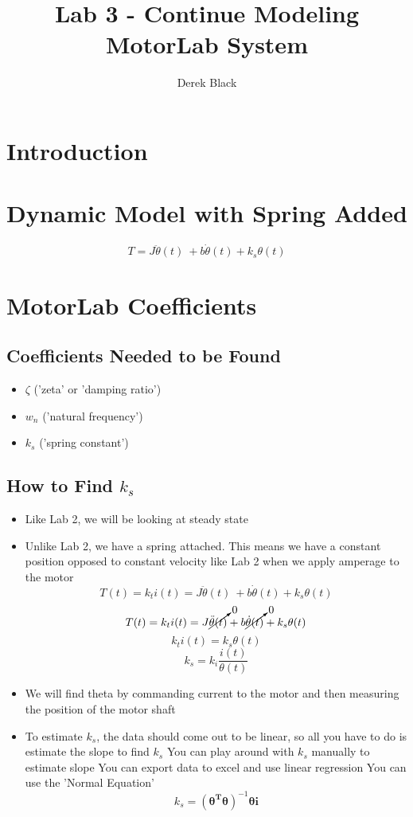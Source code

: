 \documentclass[11pt, oneside]{article}   	%
\title{\vspace{-3.0cm}Lab 3 - Continue Modeling MotorLab System}
\author{Derek Black}
\date{\vspace{-5ex}}
\newcommand{\matrva}[1]{\bm{#1}}
\begin{document}
\maketitle

\section{Introduction}

\section{Dynamic Model with Spring Added}

\[T = J \ddot \theta(t) \ + b \dot \theta(t) + k_s \theta(t) \]

\section{MotorLab Coefficients}
\subsection{Coefficients Needed to be Found}
\begin{itemize}
\item \(\zeta\)    ('zeta' or 'damping ratio')
\item \(w_n\)     ('natural frequency')
\item \(k_s\)      ('spring constant')
\end{itemize}

\subsection{How to Find \(k_s\)}
\begin{itemize}
\item Like Lab 2, we will be looking at steady state
\item Unlike Lab 2, we have a spring attached. This means we have a constant position opposed to constant velocity like Lab 2 when we apply amperage to the motor
\[T(t) = k_t i(t) =  J \ddot \theta(t) \ + b \dot \theta(t) + k_s \theta(t) \]
\[T(t) = k_t i(t) =  J \cancelto{0}{\ddot \theta(t)}  + b \cancelto{0}{\dot \theta(t)} + k_s \theta(t) \]
\[k_t i(t) = k_s \theta(t) \] \label{eu_eqn}
\[k_s = k_i \frac{i(t)}{\theta(t)} \]

\item We will find theta by commanding current to the motor and then measuring the position of the motor shaft
\item To estimate \(k_s\), the data should come out to be linear, so all you have to do is estimate the slope to find \(k_s\)
\subitem You can play around with \(k_s\) manually to estimate slope
\subitem You can export data to excel and use linear regression
\subitem You can use the 'Normal Equation'
\[k_s = (\matrva{\theta^T \theta})^{-1} \matrva{\theta i}    \]
\end{itemize}
\end{document}
